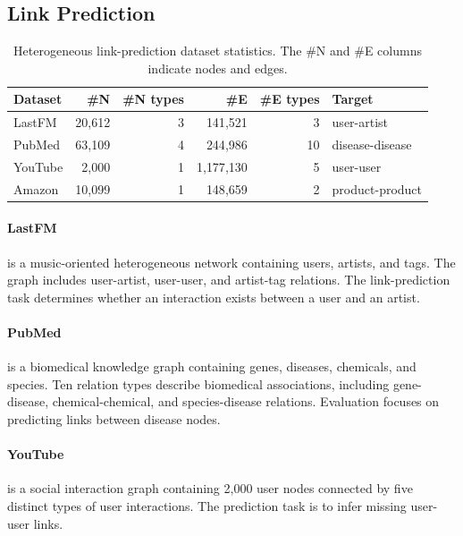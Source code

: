 \subsection{Link Prediction}

\begin{table}[H]
  \centering
  \caption{Heterogeneous link-prediction dataset statistics. The \#N and \#E columns
  indicate nodes and edges.}
  \label{tab:link-datasets}
  \scriptsize
  \resizebox{\columnwidth}{!}
  {%
  \begin{tabular}{lrrrrl}
    \toprule
    \textbf{Dataset} & \textbf{\#N} & \textbf{\#N types} & \textbf{\#E} &
    \textbf{\#E types} & \textbf{Target} \\
    \midrule
    LastFM & 20{,}612 & 3 & 141{,}521 & 3 & user-artist \\
    PubMed & 63{,}109 & 4 & 244{,}986 & 10 & disease-disease \\
    YouTube & 2{,}000 & 1 & 1{,}177{,}130 & 5 & user-user \\
    Amazon & 10{,}099 & 1 & 148{,}659 & 2 & product-product \\
    \bottomrule
  \end{tabular}%
  }
\end{table}

\paragraph{LastFM}
is a music-oriented heterogeneous network containing users, artists,
and tags. The graph includes user-artist, user-user, and artist-tag
relations. The link-prediction task determines whether an interaction exists
between a user and an artist.

\paragraph{PubMed}
is a biomedical knowledge graph containing genes, diseases, chemicals,
and species. Ten relation types describe biomedical associations, including
gene-disease, chemical-chemical, and species-disease relations. Evaluation
focuses on predicting links between disease nodes.

\paragraph{YouTube}
is a social interaction graph containing 2,000 user nodes connected by
five distinct types of user interactions. The prediction task is to infer
missing user-user links.

